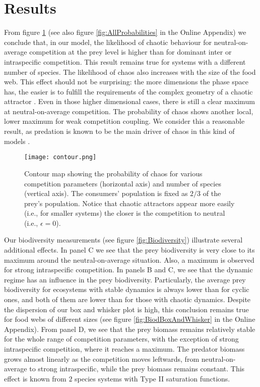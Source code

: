 \section{Results}
\label{sec:Results}
From figure \ref{fig:Contour} (see also figure \ref{fig:AllProbabilities} in the Online Appendix) we conclude that, in our model, the likelihood of chaotic behaviour for neutral-on-average competition at the prey level is higher than for dominant inter or intraspecific competition. This result remains true for systems with a different number of species. The likelihood of chaos also increases with the size of the food web. This effect should not be surprising: the more dimensions the phase space has, the easier is to fulfill the requirements of the complex geometry of a chaotic attractor \citep{Strogatz1994}. Even in those higher dimensional cases, there is still a clear maximum at neutral-on-average competition. The probability of chaos shows another local, lower maximum for weak competition coupling. We consider this a reasonable result, as predation is known to be the main driver of chaos in this kind of models \citep{Scheffer2004}.

\begin{figure}
	\begin{center}
		\texttt{[image: contour.png]}
	\end{center}
	\caption{Contour map showing the probability of chaos for various competition parameters (horizontal axis) and number of species (vertical axis). The consumers' population is fixed as $ 2/3 $ of the prey's population. Notice that chaotic attractors appear more easily (i.e., for smaller systems) the closer is the competition to neutral (i.e., $ \epsilon = 0 $).}
	\label{fig:Contour}
\end{figure}

Our biodiversity measurements (see figure \ref{fig:Biodiversity}) illustrate several additional effects. In panel C we see that the prey biodiversity is very close to its maximum around the neutral-on-average situation. Also, a maximum is observed for strong intraspecific competition. In panels B and C, we see that the dynamic regime has an influence in the prey biodiversity. Particularly, the average prey biodiversity for ecosystems with stable dynamics is always lower than for cyclic ones, and both of them are lower than for those with chaotic dynamics. Despite the dispersion of our box and whisker plot is high, this conclusion remains true for food webs of different sizes (see figure \ref{fig:BiodBoxAndWhisker} in the Online Appendix). From panel D, we see that the prey biomass remains relatively stable for the whole range of competition parameters, with the exception of strong intraspecific competition, where it reaches a maximum. The predator biomass grows almost linearly as the competition moves leftwards, from neutral-on-average to strong intraspecific, while the prey biomass remains constant. This effect is known from $ 2 $ species systems with Type II saturation functions. 

